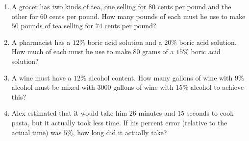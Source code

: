 \begin{enumerate}
\item[(a)] A grocer has two kinds of tea, one selling for $80$ cents per pound and the other for $60$ cents per pound. How many pounds of each must he use to make $50$ pounds of tea selling for $74$ cents per pound?
\item[(b)] A pharmacist has a $12\%$ boric acid solution and a $20\%$ boric acid solution. How much of each must he use to make $80$ grams of a $15\%$ boric acid solution?
\item[(c)] A wine must have a $12\%$ alcohol content. How many gallons of wine with $9\%$ alcohol must be mixed with $3000$ gallons of wine with $15\%$ alcohol to achieve this?
\item[(d)] Alex estimated that it would take him $26$ minutes and $15$ seconds to cook pasta, but it actually took less time. If his percent error (relative to the actual time) was $5\%$, how long did it actually take?
\end{enumerate}
